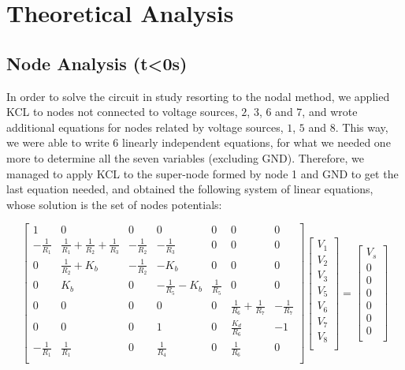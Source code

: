 \section{Theoretical Analysis}
\label{sec:analysis}

\subsection{Node Analysis (t<0s)}
\label{subsec:nodeanalysis}

In order to solve the circuit in study resorting to the nodal method, we applied KCL to nodes not connected to voltage sources, $2$, $3$, $6$ and $7$, and wrote additional equations for nodes related by voltage sources, $1$, $5$ and $8$. This way, we were able to write 6 linearly independent equations, for what we needed one more to determine all the seven variables (excluding GND). Therefore, we managed to apply KCL to the super-node formed by node 1 and GND to get the last equation needed, and obtained the following system of linear equations, whose solution is the set of nodes potentials:

\[
{\begin{bmatrix}
1 & 0 & 0 & 0 & 0 & 0 & 0\\
-\frac{1}{R_1} & \frac{1}{R_1}+\frac{1}{R_2}+\frac{1}{R_3} & -\frac{1}{R_2} & -\frac{1}{R_3} & 0 & 0 & 0\\
0 & \frac{1}{R_2}+K_b & -\frac{1}{R_2} & -K_b & 0 & 0 & 0\\
0 & K_b & 0 & -\frac{1}{R_5}-K_b & \frac{1}{R_5} & 0 & 0\\
0 & 0 & 0 & 0 & 0 & \frac{1}{R_6}+\frac{1}{R_7} & -\frac{1}{R_7}\\
0 & 0 & 0 & 1 & 0 & \frac{K_d}{R_6} & -1\\
-\frac{1}{R_1} & \frac{1}{R_1} & 0 & \frac{1}{R_4} & 0 & \frac{1}{R_6} & 0\\
            \end{bmatrix}
            }
{\begin{bmatrix}
V_1\\
V_2\\
V_3\\
V_5\\
V_6\\
V_7\\
V_8\\
            \end{bmatrix}
            }
    =
{\begin{bmatrix}
V_s\\
0\\
0\\
0\\
0\\
0\\
0\\
            \end{bmatrix}
            }
\]

